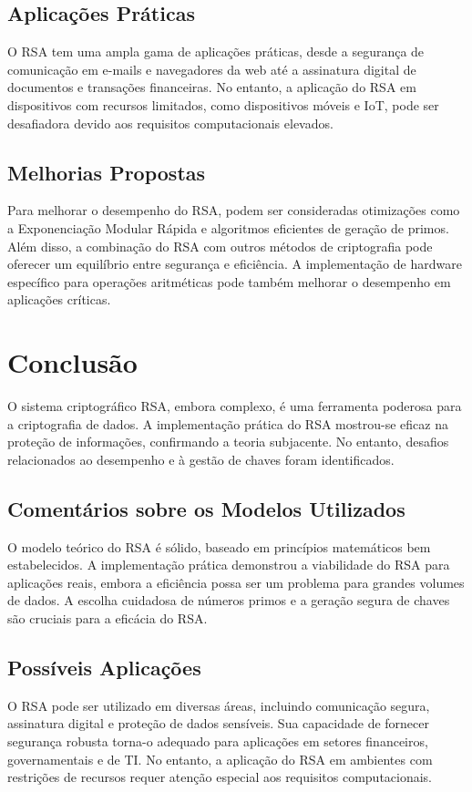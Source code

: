 \documentclass[a4paper,12pt]{article}
\begin{document}
\subsection*{Aplicações Práticas}
O RSA tem uma ampla gama de aplicações práticas, desde a segurança de comunicação em e-mails e navegadores da web até a assinatura digital de documentos e transações financeiras. No entanto, a aplicação do RSA em dispositivos com recursos limitados, como dispositivos móveis e IoT, pode ser desafiadora devido aos requisitos computacionais elevados.

\subsection*{Melhorias Propostas}
Para melhorar o desempenho do RSA, podem ser consideradas otimizações como a Exponenciação Modular Rápida e algoritmos eficientes de geração de primos. Além disso, a combinação do RSA com outros métodos de criptografia pode oferecer um equilíbrio entre segurança e eficiência. A implementação de hardware específico para operações aritméticas pode também melhorar o desempenho em aplicações críticas.

\section*{Conclusão}
O sistema criptográfico RSA, embora complexo, é uma ferramenta poderosa para a criptografia de dados. A implementação prática do RSA mostrou-se eficaz na proteção de informações, confirmando a teoria subjacente. No entanto, desafios relacionados ao desempenho e à gestão de chaves foram identificados.

\subsection*{Comentários sobre os Modelos Utilizados}
O modelo teórico do RSA é sólido, baseado em princípios matemáticos bem estabelecidos. A implementação prática demonstrou a viabilidade do RSA para aplicações reais, embora a eficiência possa ser um problema para grandes volumes de dados. A escolha cuidadosa de números primos e a geração segura de chaves são cruciais para a eficácia do RSA.

\subsection*{Possíveis Aplicações}
O RSA pode ser utilizado em diversas áreas, incluindo comunicação segura, assinatura digital e proteção de dados sensíveis. Sua capacidade de fornecer segurança robusta torna-o adequado para aplicações em setores financeiros, governamentais e de TI. No entanto, a aplicação do RSA em ambientes com restrições de recursos requer atenção especial aos requisitos computacionais.
\end{document}
